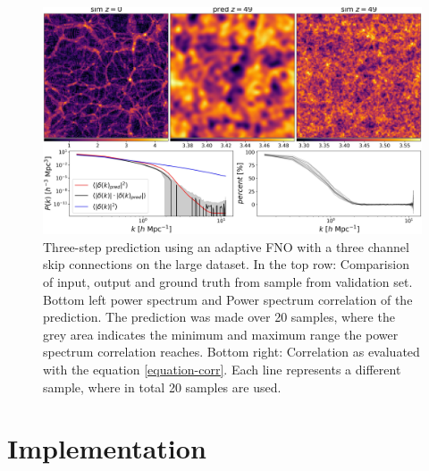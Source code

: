 \documentclass{article}
\begin{document}
\begin{figure}[h]
    \centering
    \includegraphics[width=0.9\linewidth]{img/eval_stats.jpg}
    \caption{Three-step prediction using an adaptive FNO with a three channel skip connections on the large dataset. In the top row: Comparision of input, output and ground truth from sample from validation set. Bottom left power spectrum and Power spectrum correlation of the prediction. The prediction was made over 20 samples, where the grey area indicates the minimum and maximum range the power spectrum  correlation reaches. Bottom right: Correlation as evaluated with the equation \ref{equation-corr}. Each line represents a different sample, where in total 20 samples are used.}
    \label{fig:eval-corr}
\end{figure}


\newpage
\section{Implementation}
\label{impl}
\end{document}
